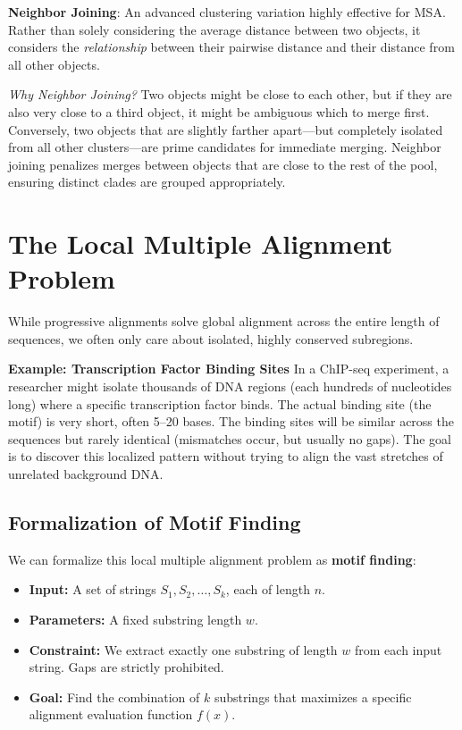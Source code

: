 \begin{important}
  \textbf{Neighbor Joining}: An advanced clustering variation highly effective for MSA. Rather than solely considering the average distance between two objects, it considers the \textit{relationship} between their pairwise distance and their distance from all other objects. 
\end{important}

\sta \textit{Why Neighbor Joining?} Two objects might be close to each other, but if they are also very close to a third object, it might be ambiguous which to merge first. Conversely, two objects that are slightly farther apart—but completely isolated from all other clusters—are prime candidates for immediate merging. Neighbor joining penalizes merges between objects that are close to the rest of the pool, ensuring distinct clades are grouped appropriately.

\section{The Local Multiple Alignment Problem}
While progressive alignments solve global alignment across the entire length of sequences, we often only care about isolated, highly conserved subregions.

\textbf{Example: Transcription Factor Binding Sites}
In a ChIP-seq experiment, a researcher might isolate thousands of DNA regions (each hundreds of nucleotides long) where a specific transcription factor binds. The actual binding site (the motif) is very short, often 5–20 bases. The binding sites will be similar across the sequences but rarely identical (mismatches occur, but usually no gaps). The goal is to discover this localized pattern without trying to align the vast stretches of unrelated background DNA.

\subsection{Formalization of Motif Finding}
We can formalize this local multiple alignment problem as \textbf{motif finding}:
\begin{itemize}
  \item \textbf{Input:} A set of strings $S_1, S_2, \dots, S_k$, each of length $n$.
  \item \textbf{Parameters:} A fixed substring length $w$.
  \item \textbf{Constraint:} We extract exactly one substring of length $w$ from each input string. Gaps are strictly prohibited.
  \item \textbf{Goal:} Find the combination of $k$ substrings that maximizes a specific alignment evaluation function $f(x)$.
\end{itemize}

